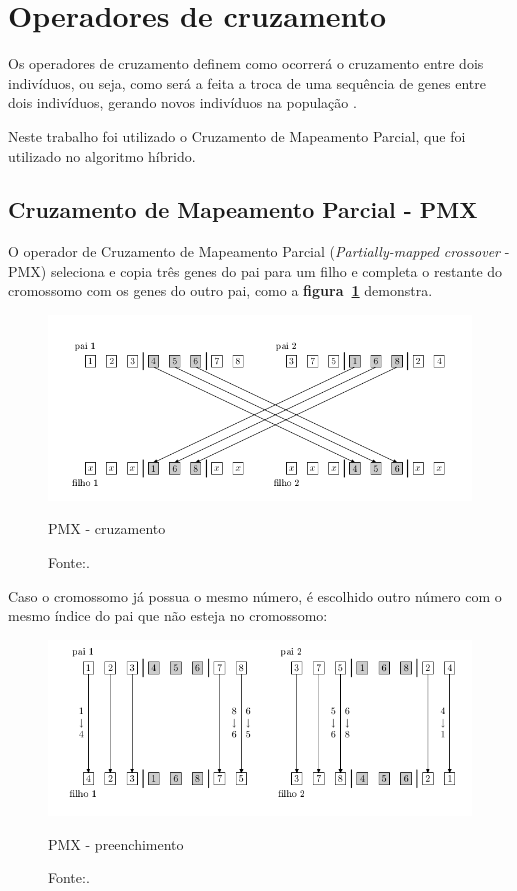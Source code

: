 \documentclass{abnt}
\begin{document}
		\section{Operadores de cruzamento}

			Os operadores de cruzamento definem como ocorrerá o cruzamento entre dois indivíduos, ou seja, como será a feita a troca de uma sequência de genes entre dois indivíduos, gerando novos indivíduos na população \cite{0012-pdf}.

			Neste trabalho foi utilizado o Cruzamento de Mapeamento Parcial, que foi utilizado no algoritmo híbrido.

		\subsection{Cruzamento de Mapeamento Parcial - PMX} 
			\label{Spmx}
			O operador de Cruzamento de Mapeamento Parcial (\textit{Partially-mapped crossover} - PMX)  seleciona e copia três genes do pai para um filho e completa o restante do cromossomo com os genes do outro pai, como a \textbf{figura~\ref{pmx}} demonstra.

			\begin{figure}[h]
				\centering
		        \includegraphics[width = 14cm,keepaspectratio]{img/pmx.png}
		        \caption{PMX - cruzamento}
		        \caption*{Fonte:\cite{0012-pdf}.}
		        \label{pmx}
	   		\end{figure}

	   		Caso o cromossomo já possua o mesmo número, é escolhido outro número com o mesmo índice do pai que não esteja no cromossomo:
	   		\begin{figure}[h]
				\centering
		        \includegraphics[width = 14cm,keepaspectratio]{img/pmx2.png}
		        \caption{PMX - preenchimento}
		        \caption*{Fonte:\cite{0012-pdf}.}
		        \label{pmx2}
	   		\end{figure}
\end{document}
